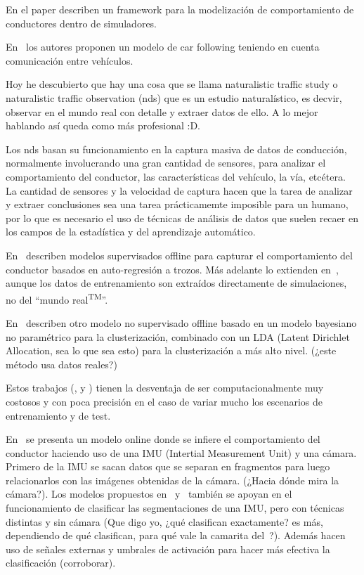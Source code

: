 En el paper \cite{al2001framework} describen un framework para la modelización de comportamiento de conductores dentro de simuladores.

En~\cite{tang2014new} los autores proponen un modelo de car following teniendo en cuenta comunicación entre vehículos.

\TODO Hoy he descubierto que hay una cosa que se llama naturalistic traffic study o naturalistic traffic observation (\gls{nds}) que es un estudio naturalístico, es decvir, observar en el mundo real con detalle y extraer datos de ello. A lo mejor hablando así queda como más profesional :D.

Los \gls{nds} basan su funcionamiento en la captura masiva de datos de conducción, normalmente involucrando una gran cantidad de sensores, para analizar el comportamiento del conductor, las características del vehículo, la vía, etcétera. La cantidad de sensores y la velocidad de captura hacen que la tarea de analizar y extraer conclusiones  sea una tarea prácticamemte imposible para un humano, por lo que es necesario el uso de técnicas de análisis de datos que suelen recaer en los campos de la estadística y del aprendizaje automático.

En~\cite{sekizawa2007modeling} describen modelos supervisados offline para capturar el comportamiento del conductor basados en auto-regresión a trozos. Más adelante lo extienden en~\cite{terada2010multi}, aunque los datos de entrenamiento son extraídos directamente de simulaciones, no del \enquote{mundo real\textsuperscript{TM}}.

En~\cite{bando2013unsupervised} describen otro modelo no supervisado offline basado en un modelo bayesiano no paramétrico para la clusterización, combinado con un LDA (Latent Dirichlet Allocation, sea lo que sea esto) para la clusterización a más alto nivel. (\TODO ¿este método usa datos reales?)

Estos trabajos (\cite{sekizawa2007modeling}, \cite{terada2010multi} y \cite{bando2013unsupervised}) tienen la desventaja de ser computacionalmente muy costosos y con poca precisión en el caso de variar mucho los escenarios de entrenamiento y de test.

En~\cite{maye2011bayesian} se presenta un modelo online donde se infiere el comportamiento del conductor haciendo uso de una IMU (Intertial Measurement Unit) y una cámara. Primero de la IMU se sacan datos que se separan en fragmentos para luego relacionarlos con las imágenes obtenidas de la cámara. (\TODO ¿Hacia dónde mira la cámara?). Los modelos propuestos en~\cite{johnson2011driving} y~\cite{van2013driver} también se apoyan en el funcionamiento de clasificar las segmentaciones de una IMU, pero con técnicas distintas y sin cámara (\TODO Que digo yo, ¿qué clasifican exactamente? es más, dependiendo de qué clasifican, para qué vale la camarita del~\cite{maye2011bayesian}?). Además hacen uso de señales externas y umbrales de activación para hacer más efectiva la clasificación (\TODO corroborar).

